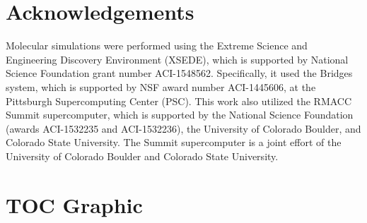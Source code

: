 \documentclass{article}
\begin{document}
  \section*{Acknowledgements}

  Molecular simulations were performed using the Extreme Science and
  Engineering Discovery Environment (XSEDE), which is supported by National
  Science Foundation grant number ACI-1548562. Specifically, it used the Bridges
  system, which is supported by NSF award number ACI-1445606, at the Pittsburgh
  Supercomputing Center (PSC). This work also utilized the RMACC Summit supercomputer,
  which is supported by the National Science Foundation (awards ACI-1532235 and
  ACI-1532236), the University of Colorado Boulder, and Colorado State
  University. The Summit supercomputer is a joint effort of the University of
  Colorado Boulder and Colorado State University.

  \clearpage

  
  

  \newpage

  \section*{TOC Graphic}
\end{document}
